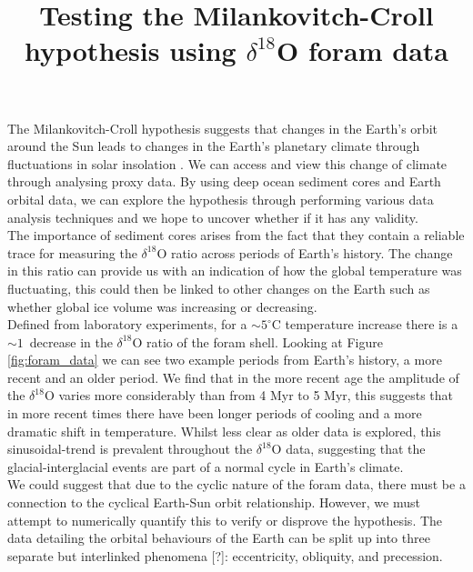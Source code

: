 \documentclass[12pt, onecolumn]{revtex4}    %
\begin{document}
                     

\title{Testing the Milankovitch-Croll hypothesis using $\delta^{18}$O foram data} 
\maketitle

\vspace{-4ex}

The Milankovitch-Croll hypothesis suggests that changes in the Earth's orbit around the Sun leads to changes in the Earth's planetary climate through fluctuations in solar insolation \cite{ruddiman_climate}. We can access and view this change of climate through analysing proxy data. By using deep ocean sediment cores and Earth orbital data, we can explore the hypothesis through performing various data analysis techniques and we hope to uncover whether if it has any validity. \\

The importance of sediment cores arises from the fact that they contain a reliable trace for measuring the $\delta^{18}$O ratio across periods of Earth's history. The change in this ratio can provide us with an indication of how the global temperature was fluctuating, this could then be linked to other changes on the Earth such as whether global ice volume was increasing or decreasing. \\

Defined from laboratory experiments, for a $\sim 5^{\circ}\mathrm{C}$ temperature increase there is a $\sim 1$\textperthousand\ decrease in the $\delta^{18}$O ratio of the foram shell. Looking at Figure \ref{fig:foram_data} we can see two example periods from Earth's history, a more recent and an older period. We find that in the more recent age the amplitude of the $\delta^{18}$O varies more considerably than from 4 Myr to 5 Myr, this suggests that in more recent times there have been longer periods of cooling and a more dramatic shift in temperature. Whilst less clear as older data is explored, this sinusoidal-trend is prevalent throughout the $\delta^{18}$O data, suggesting that the glacial-interglacial events are part of a normal cycle in Earth's climate. \\

We could suggest that due to the cyclic nature of the foram data, there must be a connection to the cyclical Earth-Sun orbit relationship. However, we must attempt to numerically quantify this to verify or disprove the hypothesis. The data detailing the orbital behaviours of the Earth can be split up into three separate but interlinked phenomena [?]: eccentricity, obliquity, and precession. \\
\end{document}
